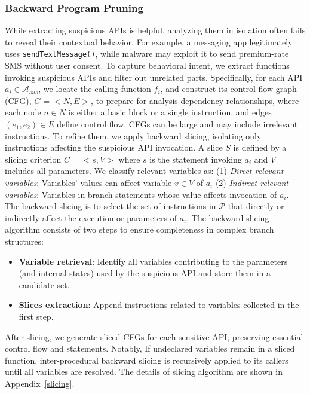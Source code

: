 \subsubsection{Backward Program Pruning}
While extracting suspicious APIs is helpful, analyzing them in isolation often fails to reveal their contextual behavior. For example, a messaging app legitimately uses \verb|sendTextMessage()|, while malware may exploit it to send premium-rate SMS without user consent. To capture behavioral intent, we extract functions invoking suspicious APIs and filter out unrelated parts. Specifically, for each API $a_i \in \mathcal{A}_{sus}$, we locate the calling function $f_i$, and construct its control flow graph (CFG), $G = <N, E>$, to prepare for analysis dependency relationships, where each node $n \in N$ is either a basic block or a single instruction, and edges $(e_1, e_2) \in E$ define control flow. CFGs can be large and may include irrelevant instructions. To refine them, we apply backward slicing, isolating only instructions affecting the suspicious API invocation. A slice $S$ is defined by a slicing criterion $C = <s, V>$ where $s$ is the statement invoking $a_i$ and $V$ includes all parameters. We classify relevant variables as: (1) \textit{Direct relevant variables}: Variables' values can affect variable $v \in V$ of $a_i$  (2) \textit{Indirect relevant variables}: Variables in branch statements whose value affects invocation of $a_i$. The backward slicing is to select the set of instructions in $\mathcal{P}$ that directly or indirectly affect the execution or parameters of $a_i$. The backward slicing algorithm consists of two steps to ensure completeness in complex branch structures:
\begin{itemize}
    \item \textbf{Variable retrieval}: Identify all variables contributing to the parameters (and internal states) used by the suspicious API and store them in a candidate set.
    \item \textbf{Slices extraction}: Append instructions related to variables collected in the first step.
\end{itemize}

After slicing, we generate sliced CFGs for each sensitive API, preserving essential control flow and statements. Notably, If undeclared variables remain in a sliced function, inter-procedural backward slicing is recursively applied to its callers until all variables are resolved. The details of slicing algorithm are shown in Appendix~\ref{slicing}.


